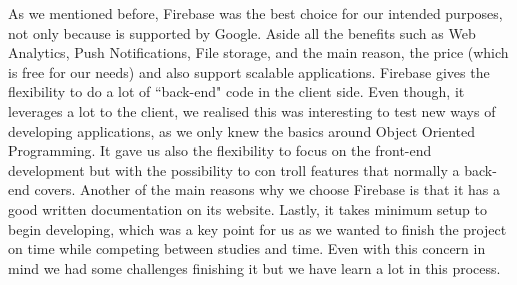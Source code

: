 As we mentioned before, Firebase was the best choice for our intended purposes, not only because is supported by Google. Aside all the benefits such as Web Analytics, Push Notifications, File storage, and the main reason, the price (which is free for our needs) and also support scalable applications. Firebase gives the flexibility to do a lot of ``back-end" code in the client side. Even though, it leverages a lot to the client, we realised this was interesting to test new ways of developing applications, as we only knew the basics around Object Oriented Programming. It gave us also the flexibility to focus on the front-end development but with the possibility to con troll features that normally a back-end covers. Another of the main reasons why we choose Firebase is that it has a good written documentation on its website. Lastly, it takes minimum setup to begin developing, which was a key point for us as we wanted to finish the project on time while competing between studies and time. Even with this concern in mind we had some challenges finishing it but we have learn a lot in this process.

